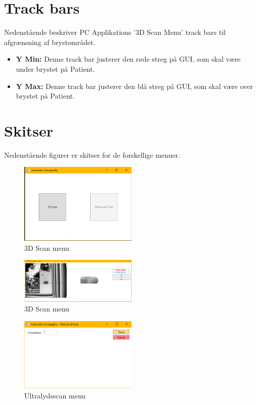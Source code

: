 \section{Track bars}
Nedenstående beskriver PC Applikations '3D Scan Menu' track bars til afgrænsning af brystområdet.  
\begin{itemize}
\item \textbf{Y Min:} Denne track bar justerer den røde streg på GUI, som skal være under brystet på Patient. 
\item \textbf{Y Max:} Denne track bar justerer den blå streg på GUI, som skal være over brystet på Patient. 
\end{itemize}
\pagebreak

\section{Skitser}
Nedenstående figurer er skitser for de forskellige menuer. 

\begin{figure}[H]
    \centering
    \includegraphics[width=0.5\textwidth]{figurer/d/GUIskitse/main_menu}
    \caption{3D Scan menu}
    \label{3Dscan}
\end{figure}

\begin{figure}[H]
    \centering
    \includegraphics[width=0.5\textwidth]{figurer/d/GUIskitse/3d_scan}
    \caption{3D Scan menu}
    \label{3Dscan}
\end{figure}

\begin{figure}[H]
    \centering
    \includegraphics[width=0.5\textwidth]{figurer/d/GUIskitse/ultrasound_scan}
    \caption{Ultralydsscan menu}
    \label{Ultralydsscan}
\end{figure}